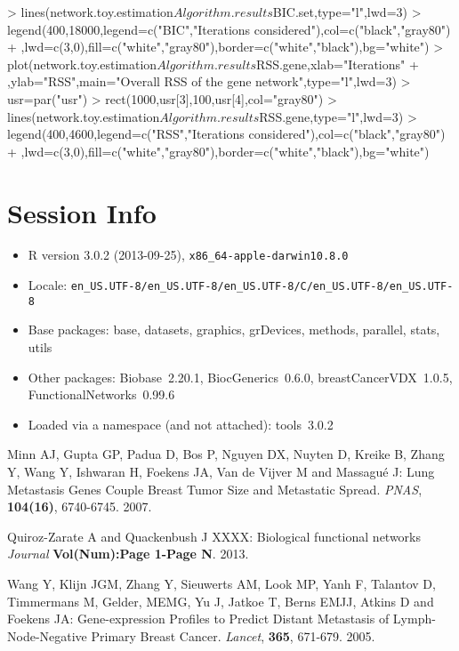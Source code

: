 \documentclass[12pt]{article}
\begin{document}
\begin{Schunk}
\begin{Sinput}
> lines(network.toy.estimation$Algorithm.results$BIC.set,type="l",lwd=3)
> legend(400,18000,legend=c("BIC","Iterations considered"),col=c("black","gray80")
+        ,lwd=c(3,0),fill=c("white","gray80"),border=c("white","black"),bg="white")
> plot(network.toy.estimation$Algorithm.results$RSS.gene,xlab="Iterations"
+      ,ylab="RSS",main="Overall RSS of the gene network",type="l",lwd=3)
> usr=par("usr")
> rect(1000,usr[3],100,usr[4],col="gray80")
> lines(network.toy.estimation$Algorithm.results$RSS.gene,type="l",lwd=3)
> legend(400,4600,legend=c("RSS","Iterations considered"),col=c("black","gray80")
+        ,lwd=c(3,0),fill=c("white","gray80"),border=c("white","black"),bg="white")
\end{Sinput}
\end{Schunk}
\normalsize
\section{Session Info}
\begin{itemize}\raggedright
  \item R version 3.0.2 (2013-09-25), \verb|x86_64-apple-darwin10.8.0|
  \item Locale: \verb|en_US.UTF-8/en_US.UTF-8/en_US.UTF-8/C/en_US.UTF-8/en_US.UTF-8|
  \item Base packages: base, datasets, graphics, grDevices, methods,
    parallel, stats, utils
  \item Other packages: Biobase~2.20.1, BiocGenerics~0.6.0,
    breastCancerVDX~1.0.5, FunctionalNetworks~0.99.6
  \item Loaded via a namespace (and not attached): tools~3.0.2
\end{itemize}\newpage
\begin{thebibliography}{10}
Minn AJ, Gupta GP, Padua D, Bos P, Nguyen DX, Nuyten D, Kreike B, Zhang Y, Wang Y, Ishwaran H, Foekens JA, Van de Vijver M and Massagu\'{e} J:
\newblock Lung Metastasis Genes Couple Breast Tumor Size and Metastatic Spread.
\newblock \textit{PNAS}, \textbf{104(16)}, 6740-6745. 2007.

Quiroz-Zarate A and  Quackenbush J
\newblock XXXX: Biological functional networks \textit{Journal}  
\newblock \textbf{Vol(Num):Page 1-Page N}. 2013.

Wang Y, Klijn JGM, Zhang Y, Sieuwerts AM, Look MP, Yanh F, Talantov D, Timmermans M, Gelder, MEMG, Yu J, Jatkoe T, Berns EMJJ, Atkins D and Foekens JA:
\newblock Gene-expression Profiles to Predict Distant Metastasis of Lymph-Node-Negative Primary Breast Cancer.
\newblock \textit{Lancet}, \textbf{365}, 671-679. 2005.
\end{thebibliography}
\end{document}

